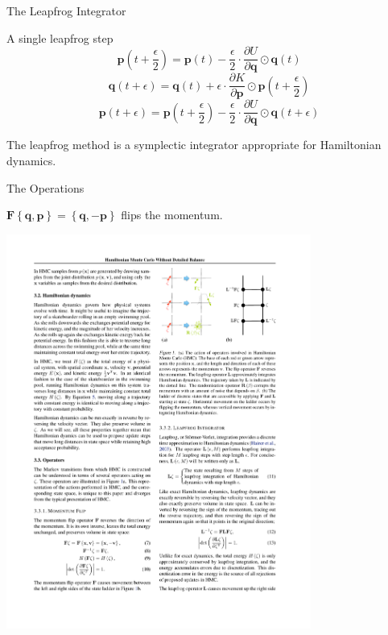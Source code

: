 \documentclass{beamer}
\renewcommand{\vec}[1]{\ensuremath{\mathbf{#1}}}
\newcommand{\op}[1]{\ensuremath{\mathbf{#1}}}
\begin{document}
    \begin{frame}{The Leapfrog Integrator}

        \begin{block}{A single leapfrog step}
            \begin{equation*}
                \vec{p}\left(t+\frac{\epsilon}{2}\right) = \vec{p}\left(t\right) - \frac{\epsilon}{2} \cdot \frac{\partial U}{\partial \vec{q}} \odot \vec{q}\left(t\right)
            \end{equation*}
            \pause
            \begin{equation*}
                \vec{q}\left(t+\epsilon\right) = \vec{q}\left(t\right) + \epsilon \cdot \frac{\partial K}{\partial \vec{p}} \odot \vec{p}\left(t+\frac{\epsilon}{2}\right)
            \end{equation*}
            \pause
            \begin{equation*}
                \vec{p}\left(t+\epsilon\right) = \vec{p}\left(t + \frac{\epsilon}{2}\right) - \frac{\epsilon}{2} \cdot \frac{\partial U}{\partial \vec{q}} \odot \vec{q}\left(t+\epsilon\right)
            \end{equation*}
        \end{block}

        The leapfrog method is a symplectic integrator appropriate for Hamiltonian dynamics.

    \end{frame}

    \begin{frame}{The Operations}

        \begin{definition}
            $\op{F}\left\{\vec{q},\vec{p}\right\} = \left\{\vec{q},-\vec{p}\right\}$ flips the momentum.
        \end{definition}

        \vfill

        \centering
        \includegraphics[width=0.75\textwidth]{F.pdf}

    \end{frame}
\end{document}
